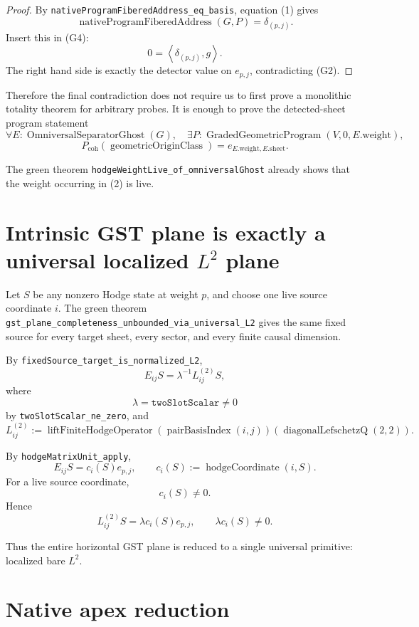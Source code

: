\documentclass[11pt]{article}
\newcommand{\pair}[2]{\left\langle #1,#2\right\rangle}
\begin{document}
\begin{proof}
By \texttt{nativeProgramFiberedAddress\_eq\_basis}, equation (1) gives
\[
 \operatorname{nativeProgramFiberedAddress}(G,P)=\delta_{(p,j)}.
\]
Insert this in (G4):
\[
 0=\pair{\delta_{(p,j)}}{g}.
\]
The right hand side is exactly the detector value on $e_{p,j}$, contradicting
(G2).
\end{proof}

Therefore the final contradiction does not require us to first prove a
monolithic totality theorem for arbitrary probes.  It is enough to prove the
detected-sheet program statement
\[
 \forall E:\operatorname{OmniversalSeparatorGhost}(G),\quad
 \exists P:\operatorname{GradedGeometricProgram}(V,0,E.\mathrm{weight}),
\]
\[
 P_{\mathrm{coh}}(\operatorname{geometricOriginClass})
 =e_{E.\mathrm{weight},E.\mathrm{sheet}}. \tag{2}
\]

The green theorem \texttt{hodgeWeightLive\_of\_omniversalGhost} already
shows that the weight occurring in (2) is live.

\section{Intrinsic GST plane is exactly a universal localized $L^2$ plane}

Let $S$ be any nonzero Hodge state at weight $p$, and choose one live source
coordinate $i$.  The green theorem
\texttt{gst\_plane\_completeness\_unbounded\_via\_universal\_L2}
gives the same fixed source for every target sheet, every sector, and every
finite causal dimension.

By \texttt{fixedSource\_target\_is\_normalized\_L2},
\[
 E_{ij}S
 =
 \lambda^{-1} L^{(2)}_{ij}S, \tag{3}
\]
where
\[
 \lambda=\texttt{twoSlotScalar}\neq0
\]
by \texttt{twoSlotScalar\_ne\_zero}, and
\[
 L^{(2)}_{ij}
 :=
 \operatorname{liftFiniteHodgeOperator}
 (\operatorname{pairBasisIndex}(i,j))
 (\operatorname{diagonalLefschetzQ}(2,2)).
\]

By \texttt{hodgeMatrixUnit\_apply},
\[
 E_{ij}S=c_i(S)e_{p,j},
 \qquad c_i(S):=\operatorname{hodgeCoordinate}(i,S). \tag{4}
\]
For a live source coordinate,
\[
 c_i(S)\neq0. \tag{5}
\]
Hence
\[
 L^{(2)}_{ij}S
 =
 \lambda c_i(S)e_{p,j},
 \qquad \lambda c_i(S)\neq0. \tag{6}
\]

Thus the entire horizontal GST plane is reduced to a single universal
primitive: localized bare $L^2$.

\section{Native apex reduction}
\end{document}
